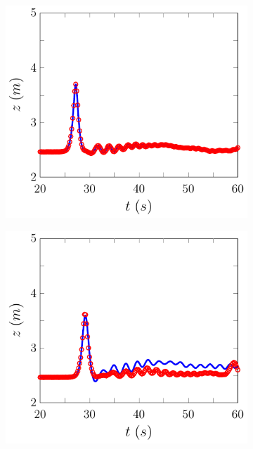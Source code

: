 \begin{figure}
	\centering
	\begin{subfigure}{0.5\textwidth}
		\includegraphics[width=\textwidth]{./chp6/figures/Experiment/Roeber/Trial8/FEVM/WG1-figure0.pdf}
		\vspace{0.5cm}
	\end{subfigure}%
	\begin{subfigure}{0.5\textwidth}
		\includegraphics[width=\textwidth]{./chp6/figures/Experiment/Roeber/Trial8/FEVM/WG2-figure0.pdf}

\end{subfigure}
\end{figure}
